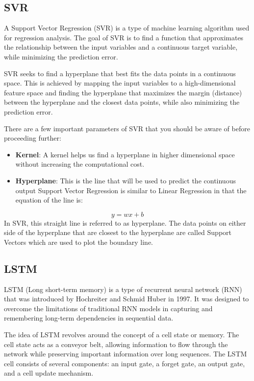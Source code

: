 \documentclass{ieeeojies}
\begin{document}
\subsection{SVR}

\hspace{0.3cm} A Support Vector Regression (SVR) is a type of machine learning algorithm used for regression analysis. The goal of SVR is to find a function that approximates the relationship between the input variables and a continuous target variable, while minimizing the prediction error.

SVR seeks to find a hyperplane that best fits the data points in a continuous space. This is achieved by mapping the input variables to a high-dimensional feature space and finding the hyperplane that maximizes the margin (distance) between the hyperplane and the closest data points, while also minimizing the prediction error.

There are a few important parameters of SVR that you should be aware of before proceeding further:
\begin{itemize}
\item \textbf{Kernel}: A kernel helps us find a hyperplane in higher dimensional space without increasing the computational cost.
\item \textbf{Hyperplane}: This is the line that will be used to predict the continuous output
Support Vector Regression is similar to Linear Regression in that the equation of the line is:
\end{itemize}
$$y = wx + b$$
\hspace{0.3cm}In SVR, this straight line is referred to as hyperplane. The data points on either side of the hyperplane that are closest to the hyperplane are called Support Vectors which are used to plot the boundary line.
\subsection{LSTM}

\hspace{0.3cm}LSTM (Long short-term memory) is a type of recurrent neural network (RNN) that was introduced by Hochreiter and Schmid Huber in 1997. It was designed to overcome the limitations of traditional RNN models in capturing and remembering long-term dependencies in sequential data.

The idea of LSTM revolves around the concept of a cell state or memory. The cell state acts as a conveyor belt, allowing information to flow through the network while preserving important information over long sequences. The LSTM cell consists of several components: an input gate, a forget gate, an output gate, and a cell update mechanism.
\end{document}

